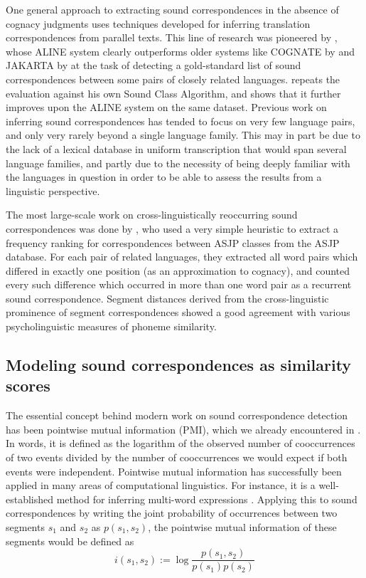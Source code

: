 One general approach to extracting sound correspondences in the absence of cognacy judgments uses techniques developed for inferring translation correspondences from parallel texts. This line of research was pioneered by \cite{kondrak2002}, whose ALINE system clearly outperforms older systems like COGNATE by \cite{guy1984} and JAKARTA by \cite{oakes2000} at the task of detecting a gold-standard list of sound correspondences between some pairs of closely related languages. \cite{list2014} repeats the evaluation against his own Sound Class Algorithm, and shows that it further improves upon the ALINE system on the same dataset. Previous work on inferring sound correspondences has tended to focus on very few language pairs, and only very rarely beyond a single language family. This may in part be due to the lack of a lexical database in uniform transcription that would span several language families, and partly due to the necessity of being deeply familiar with the languages in question in order to be able to 
assess the results from a linguistic perspective.

The most large-scale work on cross-linguistically reoccurring sound correspondences was done by \cite{brown_ea_2013}, who used a very simple heuristic to extract a frequency ranking for correspondences between ASJP classes from the ASJP database. For each pair of related languages, they extracted all word pairs which differed in exactly one position (as an approximation to cognacy), and counted every such difference which occurred in more than one word pair as a recurrent sound correspondence. Segment distances derived from the cross-linguistic prominence of segment correspondences showed a good agreement with various psycholinguistic measures of phoneme similarity.

\subsection{Modeling sound correspondences as similarity scores}
The essential concept behind modern work on sound correspondence detection has been pointwise mutual information (PMI), which we already encountered in . In words, it is defined as the logarithm of the observed number of cooccurrences of two events divided by the number of cooccurrences we would expect if both events were independent. Pointwise mutual information has successfully been applied in many areas of computational linguistics. For instance, it is a well-established method for inferring multi-word expressions \citep[e.g.][]{bouma2009}. Applying this to sound correspondences by writing the joint probability of occurrences between two segments $s_1$ and $s_2$ as $p(s_1,s_2)$, the pointwise mutual information of these segments would be defined as
\begin{equation}
 i(s_1,s_2) := \log \frac{p(s_1,s_2)}{p(s_1)p(s_2)}
\end{equation}

